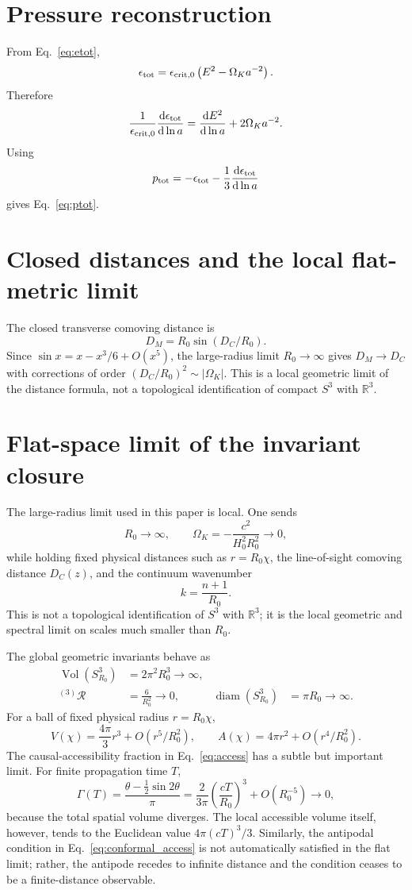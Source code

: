 \documentclass[
  aps,
  prd,
  reprint,
  superscriptaddress,
  nofootinbib,
  floatfix,
  longbibliography
]{revtex4-2}
\theoremstyle{plain}
\theoremstyle{definition}
\theoremstyle{remark}
\newcommand{\dd}{\mathrm d}
\newcommand{\RR}{\mathbb R}
\newcommand{\crit}{\epsilon_{\mathrm{crit},0}}
\newcommand{\Omk}{\Omega_K}
\newcommand{\Vol}{\operatorname{Vol}}
\newcommand{\diam}{\operatorname{diam}}
\begin{document}
\appendix

\section{Pressure reconstruction}

From Eq.~\eqref{eq:etot},
\[
\epsilon_{\rm tot}=\crit\left(E^2-\Omk a^{-2}\right).
\]
Therefore
\[
\frac{1}{\crit}\frac{\dd\epsilon_{\rm tot}}{\dd\ln a}
=\frac{\dd E^2}{\dd\ln a}+2\Omk a^{-2}.
\]
Using
\[
p_{\rm tot}=-\epsilon_{\rm tot}
-\frac13\frac{\dd\epsilon_{\rm tot}}{\dd\ln a}
\]
gives Eq.~\eqref{eq:ptot}.

\section{Closed distances and the local flat-metric limit}

The closed transverse comoving distance is
\[
D_M=R_0\sin(D_C/R_0).
\]
Since $\sin x=x-x^3/6+O(x^5)$, the large-radius limit $R_0\to\infty$ gives
$D_M\to D_C$ with corrections of order $(D_C/R_0)^2\sim|\Omega_K|$.  This is a
local geometric limit of the distance formula, not a topological identification
of compact $S^3$ with $\RR^3$.


\section{Flat-space limit of the invariant closure}
\label{app:flat_limit}

The large-radius limit used in this paper is local.  One sends
\[
R_0\to\infty,\qquad \Omega_K=-\frac{c^2}{H_0^2R_0^2}\to0,
\]
while holding fixed physical distances such as
$r=R_0\chi$, the line-of-sight comoving distance $D_C(z)$, and the continuum
wavenumber
\[
k=\frac{n+1}{R_0}.
\]
This is not a topological identification of $S^3$ with $\RR^3$; it is the
local geometric and spectral limit on scales much smaller than $R_0$.

The global geometric invariants behave as
\begin{align}
\Vol(S^3_{R_0})&=2\pi^2R_0^3\to\infty,
\nonumber\\
{}^{(3)}\mathcal R&=\frac{6}{R_0^2}\to0,
&
\diam(S^3_{R_0})&=\pi R_0\to\infty .
\end{align}
For a ball of fixed physical radius $r=R_0\chi$,
\[
V(\chi)=\frac{4\pi}{3}r^3+O(r^5/R_0^2),\qquad
A(\chi)=4\pi r^2+O(r^4/R_0^2).
\]
The causal-accessibility fraction in Eq.~\eqref{eq:access} has a subtle but
important limit.  For finite propagation time $T$,
\[
\Gamma(T)=\frac{\theta-\frac12\sin2\theta}{\pi}
=\frac{2}{3\pi}\left(\frac{cT}{R_0}\right)^3
+O(R_0^{-5})\to0,
\]
because the total spatial volume diverges.  The local accessible volume itself,
however, tends to the Euclidean value $4\pi(cT)^3/3$.  Similarly, the antipodal
condition in Eq.~\eqref{eq:conformal_access} is not automatically satisfied in
the flat limit; rather, the antipode recedes to infinite distance and the
condition ceases to be a finite-distance observable.
\end{document}
